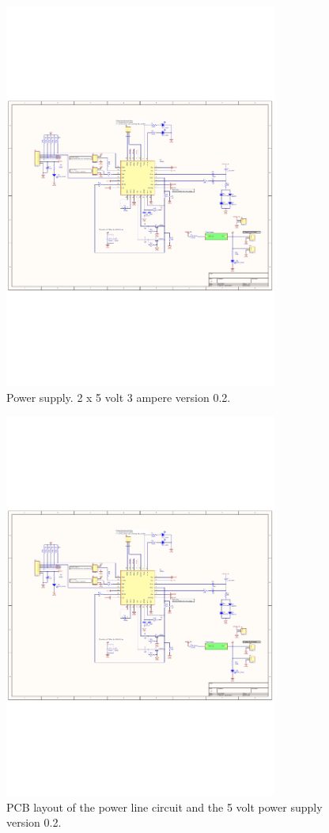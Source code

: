 \begin{figure}[H]
	\begin{centering}
		 \includegraphics[width=0.8\textwidth,page=2,angle=0]{images/SIG60_v0_2}
		\caption{Power supply. 2 x 5 volt 3 ampere version 0.2.}
	\end{centering}
\end{figure}

\begin{figure}[H]
	\begin{centering}
		 \includegraphics[width=0.8\textwidth,page=3,angle=0]{images/SIG60_v0_2}
		\caption{PCB layout of the power line circuit and the 5 volt power supply version 0.2.}
	\end{centering}
\end{figure}

